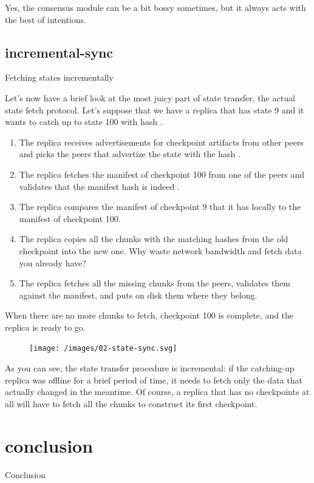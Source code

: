 \documentclass{article}
\begin{document}
Yes, the consensus module can be a bit bossy sometimes, but it always acts with the best of intentions.

\subsection{incremental-sync}{Fetching states incrementally}

Let's now have a brief look at the most juicy part of state transfer, the actual state fetch protocol.
Let's suppose that we have a replica that has state 9 and it wants to catch up to state 100 with hash .
\begin{enumerate}
\item The replica receives advertisements for checkpoint artifacts from other peers and picks the peers that advertize the state with the hash .
\item The replica fetches the manifest of checkpoint 100 from one of the peers and validates that the manifest hash is indeed .
\item The replica compares the manifest of checkpoint 9 that it has locally to the manifest of checkpoint 100.
\item 
  The replica copies all the chunks with the matching hashes from the old checkpoint into the new one.
  Why waste network bandwidth and fetch data you already have?
\item The replica fetches all the missing chunks from the peers, validates them against the manifest, and puts on disk them where they belong.
\end{enumerate}

When there are no more chunks to fetch, checkpoint 100 is complete, and the replica is ready to go.

\begin{figure}[grayscale-diagram]
\texttt{[image: /images/02-state-sync.svg]}
\end{figure}

As you can see, the state transfer procedure is incremental: if the catching-up replica was offline for a brief period of time, it needs to fetch only the data that actually changed in the meantime.
Of course, a replica that has no checkpoints at all will have to fetch all the chunks to construct its first checkpoint.

\section{conclusion}{Conclusion}
\end{document}
